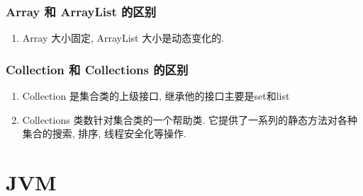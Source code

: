 \documentclass[UTF8]{ctexart}
\begin{document}
	\subsubsection{Array 和 ArrayList 的区别}
	\begin{enumerate}
		\item Array 大小固定, ArrayList 大小是动态变化的.
	\end{enumerate}
	\subsubsection{Collection 和 Collections 的区别}
	\begin{enumerate}
		\item Collection 是集合类的上级接口, 继承他的接口主要是set和list
		\item Collections 类数针对集合类的一个帮助类. 它提供了一系列的静态方法对各种集合的搜索, 排序, 线程安全化等操作.
	\end{enumerate}


\section{JVM}
\end{document}
